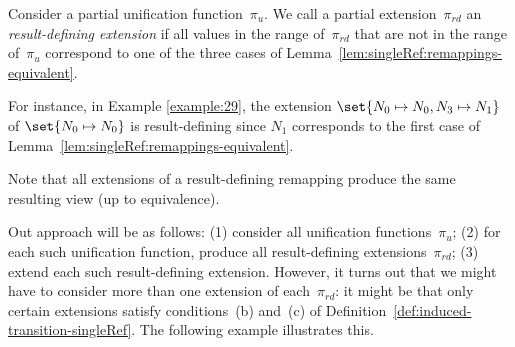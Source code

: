 \begin{definition}
Consider a partial unification function~$\pi_u$.  We call a partial
extension~$\pi_{rd}$ an \emph{result-defining extension} if all values in the
range of~$\pi_{rd}$ that are not in the range of~$\pi_u$ correspond to one of the
three cases of Lemma~\ref{lem:singleRef:remappings-equivalent}.
\end{definition}

For instance, in Example \ref{example:29}, the extension $\set{N_0
  \mapsto N_0, \linebreak[1] {N_3 \mapsto N_1}}$ of $\set{N_0 \mapsto N_0}$ is
result-defining since $N_1$ corresponds to the first case of
Lemma~\ref{lem:singleRef:remappings-equivalent}. 

Note that all extensions of a result-defining remapping produce the same
resulting view (up to equivalence).

Out approach will be as follows: (1) consider all unification
functions~$\pi_u$; (2) for each such unification function, produce all
result-defining extensions~$\pi_{rd}$; (3) extend each such result-defining
extension.  However, it turns out that we might have to consider more than one
extension of each~$\pi_{rd}$: it might be that only certain extensions satisfy
conditions~(b) and~(c) of Definition~\ref{def:induced-transition-singleRef}.
The following example illustrates this.




